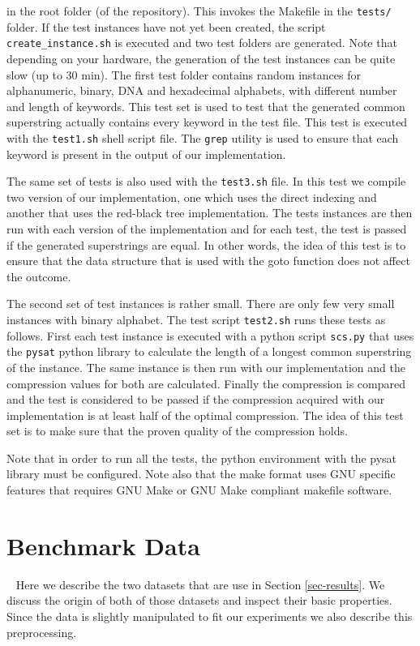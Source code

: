 \documentclass[english,twoside,censored,csm,algorithms-track-2020]{HYthesisML}
\theoremstyle{plain}
\theoremstyle{definition}
\numberwithin{testexample}{chapter}
\begin{document}
in the root folder (of the repository). This invokes the Makefile in the \texttt{tests/} folder. If the
test instances have not yet been created, the script \texttt{create\_instance.sh} is executed and two
test folders are generated. Note that depending on your hardware, the generation of the test instances
can be quite slow (up to 30 min).
The first test folder contains random instances for alphanumeric, binary,
DNA and hexadecimal alphabets, with different number and length of keywords. This test set is used
to test that the generated common superstring actually contains every keyword in the test file. This
test is executed with the \texttt{test1.sh} shell script file. The \texttt{grep} utility is used to ensure
that each keyword is present in the output of our implementation. 

The same set of tests is also used with the \texttt{test3.sh} file. In this test we compile two version
of our implementation, one which uses the direct indexing and another that uses the red-black tree
implementation. The tests instances are then run with each version of the implementation and for each
test, the test is passed if the generated superstrings are equal. In other words, the idea of this
test is to ensure that the data structure that is used with the goto function does not affect
the outcome.

The second set of test instances is rather small. There are only few very small instances with binary
alphabet. The test script \texttt{test2.sh} runs these tests as follows. First each test instance is
executed with a python script \texttt{scs.py} that uses the \texttt{pysat} python library to calculate
the length of a longest common superstring of the instance. The same instance is then run with our
implementation and the compression values for both are calculated. Finally the compression is compared
and the test is considered to be passed if the compression acquired with our implementation is
at least half of the optimal compression. The idea of this test set is to make sure that the proven
quality of the compression holds.

Note that in order to run all the tests, the python environment with the pysat library must be configured.
Note also that the make format uses GNU specific features that requires GNU Make or GNU Make compliant
makefile software. 



\section{Benchmark Data}~\label{data}
Here we describe the two datasets that are use in Section \ref{sec-results}. We discuss the origin
of both of those datasets and inspect their basic properties. Since the data is slightly manipulated
to fit our experiments we also describe this preprocessing.
\end{document}
